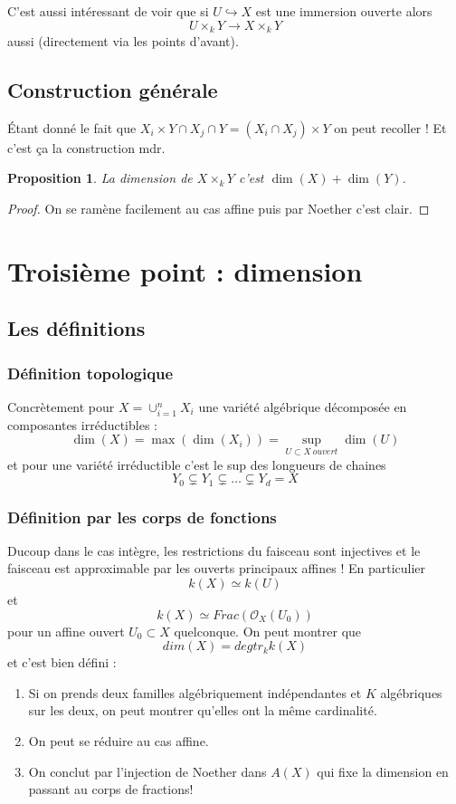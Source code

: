 \documentclass[a4paper,12pt]{book}
\newcommand{\Or}{\mathcal{O}}
\theoremstyle{plain}
\newtheorem{prop}[subsection]{Proposition}
\theoremstyle{definition}
\theoremstyle{remark}
\begin{document}
C'est aussi intéressant de voir que si $U\hookrightarrow X$ est une
immersion ouverte alors
\[U\times_k Y\to X\times_k Y\]
aussi (directement via les points d'avant).
\section{Construction générale}
Étant donné le fait que $X_i\times Y\cap X_j\cap Y=(X_i\cap X_j)\times Y$
on peut recoller ! Et c'est ça la construction mdr. 

\begin{prop}
    La dimension de $X\times_k Y$ c'est $\dim(X)+\dim(Y)$.
\end{prop}
\begin{proof}
    On se ramène facilement au cas affine puis par Noether c'est clair.
\end{proof}


\chapter{Troisième point : dimension}

\section{Les définitions}
\subsection{Définition topologique}
Concrètement pour $X=\cup_{i=1}^n X_i$ une variété algébrique décomposée
en composantes irréductibles :
\[\dim(X)=\max(\dim(X_i))=\sup_{U\subset X~ouvert} \dim(U)\]
et pour une variété irréductible c'est le sup des longueurs de chaines
\[Y_0\subsetneq Y_1\subsetneq \ldots \subsetneq Y_d=X\]

\subsection{Définition par les corps de fonctions}
Ducoup dans le cas intègre, les restrictions du faisceau sont 
injectives et le faisceau est approximable par les ouverts principaux
affines ! En particulier 
\[k(X)\simeq k(U)\]
et \[k(X)\simeq Frac(\Or_X(U_0))\]
pour un affine ouvert $U_0\subset X$ quelconque. On peut montrer que
\[dim(X)= degtr_k k(X)\]
et c'est bien défini :
\begin{enumerate}
    \item Si on prends deux familles algébriquement 
indépendantes et $K$ algébriques sur les deux, on peut montrer qu'elles
ont la même cardinalité. 
    \item On peut se réduire au cas affine.
    \item On conclut par l'injection de Noether dans $A(X)$ qui fixe la
	dimension en passant au corps de fractions!
\end{enumerate}
\end{document}
